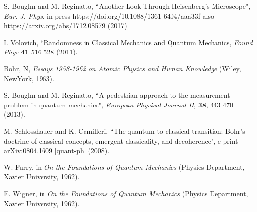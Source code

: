 \documentclass[12pt]{article}
\begin{document}
\begin{thebibliography}{99}
 S. Boughn and M. Reginatto, ``Another Look Through Heisenberg's Microscope", {\it Eur. J. Phys.} in press https://doi.org/10.1088/1361-6404/aaa33f also https://arxiv.org/abs/1712.08579 (2017).  

 I. Volovich, ``Randomness in Classical Mechanics and Quantum Mechanics, {\it Found Phys} \textbf{41} 516-528 (2011).

 Bohr, N, {\it Essays 1958-1962 on Atomic Physics and Human Knowledge} (Wiley, NewYork, 1963).

 S. Boughn and M. Reginatto, ``A pedestrian approach to the measurement problem in quantum mechanics", {\it European Physical Journal H}, \textbf{38}, 443-470 (2013).

 M. Schlosshauer and K. Camilleri, ``The quantum-to-classical transition: Bohr's doctrine of classical concepts, emergent classicality, and decoherence", e-print arXiv:0804.1609 [quant-ph] (2008).

 W. Furry, in {\it On the Foundations of Quantum Mechanics} (Physics Department, Xavier University, 1962).

 E. Wigner, in {\it On the Foundations of Quantum Mechanics} (Physics Department, Xavier University, 1962).

\end{thebibliography}
\end{document}
